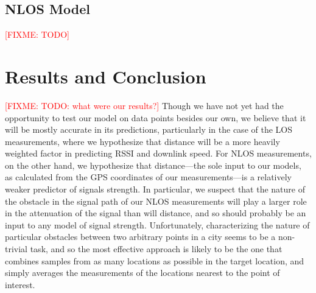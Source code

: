\documentclass[12pt]{article}
\newcommand{\fixme}[1]{\textcolor{red}{[FIXME: #1]}}
\begin{document}
\subsection{NLOS Model}
\fixme{TODO}

\section{Results and Conclusion}
\fixme{TODO: what were our results?}
Though we have not yet had the opportunity to test our model on data points
besides our own, we believe that it will be mostly accurate in its predictions,
particularly in the case of the LOS measurements, where we hypothesize that
distance will be a more heavily weighted factor in predicting RSSI and downlink
speed.
For NLOS measurements, on the other hand, we hypothesize that distance---the
sole input to our models, as calculated from the GPS coordinates of our
measurements---is a relatively weaker predictor of signals strength. In
particular, we suspect that the nature of the obstacle in the signal path of our
NLOS measurements will play a larger role in the attenuation of the signal than
will distance, and so should probably be an input to any model of signal
strength. Unfortunately, characterizing the nature of particular obstacles
between two arbitrary points in a city seems to be a non-trivial task, and so
the most effective approach is likely to be the one that combines samples from
as many locations as possible in the target location, and simply averages the
measurements of the locations nearest to the point of interest.

%
%
\end{document}
